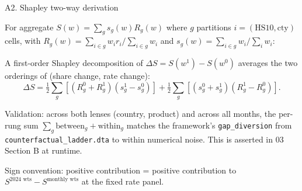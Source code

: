 \documentclass[aspectratio=169,10pt]{beamer}
\begin{document}
\begin{frame}{A2. Shapley two-way derivation}
\hypertarget{appendix_shapley}{}

\small

For aggregate $S(w) = \sum_g s_g(w) R_g(w)$ where $g$ partitions $i = (\text{HS10}, \text{cty})$ cells, with $R_g(w) = \sum_{i \in g} w_i r_i / \sum_{i \in g} w_i$ and $s_g(w) = \sum_{i \in g} w_i / \sum_i w_i$:

\medskip

A first-order Shapley decomposition of $\Delta S = S(w^1) - S(w^0)$ averages the two orderings of (share change, rate change):
\[
\Delta S = \tfrac{1}{2}\!\sum_g\!\left[(R_g^0 + R_g^1)(s_g^1 - s_g^0)\right] + \tfrac{1}{2}\!\sum_g\!\left[(s_g^0 + s_g^1)(R_g^1 - R_g^0)\right].
\]

\medskip

Validation: across both lenses (country, product) and across all months, the per-rung sum $\sum_g \text{between}_g + \text{within}_g$ matches the framework's \texttt{gap\_diversion} from \texttt{counterfactual\_ladder.dta} to within numerical noise. This is asserted in 03 Section B at runtime.

\medskip

Sign convention: positive contribution = positive contribution to $S^{\text{2024 wts}} - S^{\text{monthly wts}}$ at the fixed rate panel.

\vfill
\hyperlink{slide_shapley_intro}{}

\end{frame}
\end{document}
